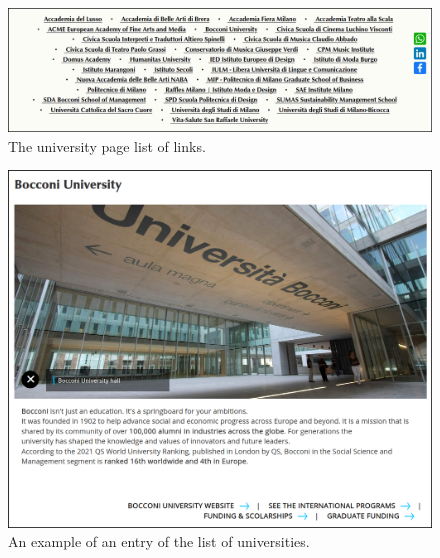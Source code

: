 \begin{itemize}
        \begin{figure}[!ht]
            \includegraphics[width=\linewidth]{images/MC1-1.png}
            \caption{The university page list of links.}
            \label{fig:MC1-1}
        \end{figure}
        \begin{figure}[!ht]
            \centering
            \includegraphics[width=0.7\linewidth]{images/MC1-2.png}
            \caption{An example of an entry of the list of universities.}
            \label{fig:MC1-2}
        \end{figure}
        

\end{itemize}
